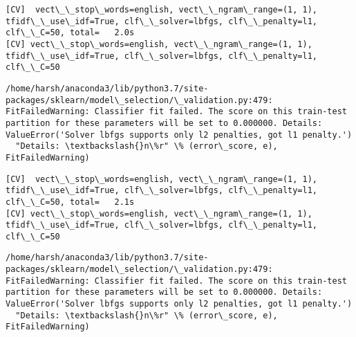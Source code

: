 \documentclass[11pt]{article}
\begin{document}
    \begin{Verbatim}[commandchars=\\\{\}]
[CV]  vect\_\_stop\_words=english, vect\_\_ngram\_range=(1, 1), tfidf\_\_use\_idf=True, clf\_\_solver=lbfgs, clf\_\_penalty=l1, clf\_\_C=50, total=   2.0s
[CV] vect\_\_stop\_words=english, vect\_\_ngram\_range=(1, 1), tfidf\_\_use\_idf=True, clf\_\_solver=lbfgs, clf\_\_penalty=l1, clf\_\_C=50 

    \end{Verbatim}

    \begin{Verbatim}[commandchars=\\\{\}]
/home/harsh/anaconda3/lib/python3.7/site-packages/sklearn/model\_selection/\_validation.py:479: FitFailedWarning: Classifier fit failed. The score on this train-test partition for these parameters will be set to 0.000000. Details: 
ValueError('Solver lbfgs supports only l2 penalties, got l1 penalty.')
  "Details: \textbackslash{}n\%r" \% (error\_score, e), FitFailedWarning)

    \end{Verbatim}

    \begin{Verbatim}[commandchars=\\\{\}]
[CV]  vect\_\_stop\_words=english, vect\_\_ngram\_range=(1, 1), tfidf\_\_use\_idf=True, clf\_\_solver=lbfgs, clf\_\_penalty=l1, clf\_\_C=50, total=   2.1s
[CV] vect\_\_stop\_words=english, vect\_\_ngram\_range=(1, 1), tfidf\_\_use\_idf=True, clf\_\_solver=lbfgs, clf\_\_penalty=l1, clf\_\_C=50 

    \end{Verbatim}

    \begin{Verbatim}[commandchars=\\\{\}]
/home/harsh/anaconda3/lib/python3.7/site-packages/sklearn/model\_selection/\_validation.py:479: FitFailedWarning: Classifier fit failed. The score on this train-test partition for these parameters will be set to 0.000000. Details: 
ValueError('Solver lbfgs supports only l2 penalties, got l1 penalty.')
  "Details: \textbackslash{}n\%r" \% (error\_score, e), FitFailedWarning)

    \end{Verbatim}
\end{document}
